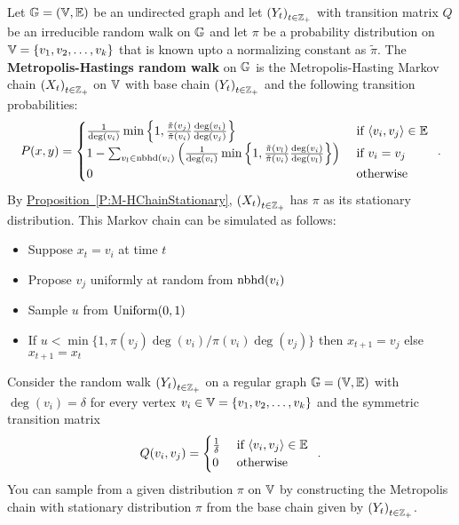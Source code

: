 \begin{model}  
Let $\mathbb{G}=(\mathbb{V},\mathbb{E})$ be an undirected graph and let $\left(Y_t\right)_{t \in \mathbb{Z}_+}$ with transition matrix $Q$ be an irreducible random walk on $\mathbb{G}$ and let $\pi$ be a probability distribution on $\mathbb{V}=\{v_1,v_2,\ldots,v_k\}$ that is known upto a normalizing constant as $\tilde{\pi}$.  
The {\bf Metropolis-Hastings random walk} on $\mathbb{G}$ is the Metropolis-Hasting Markov chain $\left(X_t\right)_{t\in \mathbb{Z}_+}$ on $\mathbb{V}$ with base chain $\left(Y_t\right)_{t\in \mathbb{Z}_+}$ and the following transition probabilities:
\[
P(x,y) = 
\begin{cases}
\frac{1}{\deg(v_i)}\min \left\{ 1, \frac{\tilde{\pi}(v_j)}{\tilde{\pi}(v_i)} \frac{\deg(v_i)}{\deg(v_j)} \right\} & \text{ if } \langle v_i,v_j \rangle \in \mathbb{E} \\
1 - \sum_{v_l \in \operatorname{nbhd}(v_i)} \left( \frac{1}{\deg(v_i)} \min \left\{ 1, \frac{\tilde{\pi}(v_l)}{\tilde{\pi}(v_i)} \frac{\deg(v_i)}{\deg(v_l)} \right\} \right) & \text{ if } v_i=v_j\\
0 & \text{ otherwise }
\end{cases} \enspace .
\]
By \hyperref[P:M-HChainStationary]{Proposition~\ref*{P:M-HChainStationary}}, $\left(X_t\right)_{t\in \mathbb{Z}_+}$ has $\pi$ as its stationary distribution.
This Markov chain can be simulated as follows:
\begin{itemize}
\item Suppose $x_t = v_i$ at time $t$
\item Propose $v_j$ uniformly at random from $\operatorname{nbhd}(v_i)$
\item Sample $u$ from $\mbox{{\rm Uniform}}(0,1)$
\item If $u < \min \{1, \pi(v_j)\deg(v_i)/\pi(v_i)\deg(v_j)\}$ then $x_{t+1}=v_j$ else $x_{t+1}=x_t$
\end{itemize}
\end{model}

\begin{model}\label{M:MetropolisChainRWRegGraph}
Consider the random walk $\left(Y_t \right)_{t \in \mathbb{Z}_+}$ on a regular graph $\mathbb{G}=(\mathbb{V},\mathbb{E})$ with $\deg(v_i)=\delta$ for every vertex $v_i \in \mathbb{V}=\{v_1,v_2,\ldots,v_k\}$ and the symmetric transition matrix 
\[
Q(v_i,v_j) = 
\begin{cases} 
\frac{1}{\delta} & \text{ if } \langle v_i,v_j \rangle \in \mathbb{E} \\
0 & \text{ otherwise}
\end{cases} \enspace .
\]
You can sample from a given distribution $\pi$ on $\mathbb{V}$ by constructing the Metropolis chain with stationary distribution $\pi$ from the base chain given by $\left(Y_t \right)_{t \in \mathbb{Z}_+}$.
\end{model}

